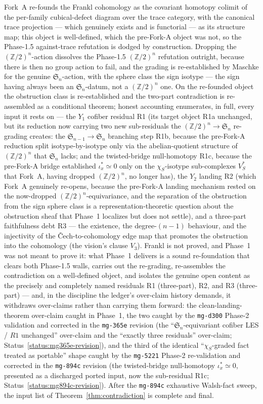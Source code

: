 \documentclass[11pt,oneside]{amsart}
\theoremstyle{plain}
\theoremstyle{definition}
\theoremstyle{remark}
\theoremstyle{honeststyle}
\newcommand{\Sym}{\mathfrak{S}}
\newcommand{\Z}{\mathbb{Z}}
\newcommand{\walsh}[1]{\chi_{#1}}
\begin{document}
Fork~A re-founds the Frankl cohomology as the covariant homotopy
colimit of the per-family cubical-defect diagram over the trace
category, with the canonical trace projection --- which genuinely
exists and is functorial --- as its structure map; this object is
well-defined, which the pre-Fork-A object was not, so the Phase-1.5
against-trace refutation is dodged by construction. Dropping the
$(\Z/2)^n$-action dissolves the Phase-1.5 $(\Z/2)^n$ refutation
outright, because there is then no group action to fail, and the
grading is re-established by Maschke for the genuine $\Sym_n$-action,
with the sphere class the sign isotype --- the sign having always been
an $\Sym_n$-datum, not a $(\Z/2)^n$ one. On the re-founded object the
obstruction class is re-established and the two-part contradiction is
re-assembled as a conditional theorem; honest accounting enumerates,
in full, every input it rests on --- the $Y_1$ cofiber residual R1
(its target object R1a unchanged, but its reduction now carrying two
new sub-residuals the $(\Z/2)^n\to\Sym_n$ re-grading creates: the
$\Sym_{n-1}\to\Sym_n$ branching step R1b, because the pre-Fork-A
reduction split isotype-by-isotype only via the abelian-quotient
structure of $(\Z/2)^n$ that $\Sym_n$ lacks; and the twisted-bridge
null-homotopy R1c, because the pre-Fork-A bridge established
$\iota_x^{*}\simeq0$ only on the $\walsh{S}$-isotype sub-complexes
$V_S^{*}$ that Fork~A, having dropped $(\Z/2)^n$, no longer has), the
$Y_2$ landing R2
(which Fork~A genuinely re-opens, because the pre-Fork-A landing
mechanism rested on the now-dropped $(\Z/2)^n$-equivariance, and the
separation of the obstruction from the sign sphere class is a
representation-theoretic question about the obstruction sheaf that
Phase~1 localizes but does not settle), and a three-part faithfulness
debt R3 --- the existence, the degree-$(n-1)$ behaviour, and the
injectivity of the \v{C}ech-to-cohomology edge map that promotes the
obstruction into the cohomology (the vision's clause $V_3$). Frankl is not proved, and Phase~1
was not meant to prove it: what Phase~1 delivers is a sound
re-foundation that clears both Phase-1.5 walls, carries out the
re-grading, re-assembles the contradiction on a well-defined object,
and isolates the genuine open content as the precisely and completely
named residuals R1 (three-part), R2, and R3 (three-part) --- and, in
the discipline the ledger's over-claim history demands, it withdraws
over-claims rather than carrying them forward: the
clean-landing-theorem over-claim caught in Phase~1, the two caught by
the \texttt{mg-d300} Phase-2 validation and corrected in the
\texttt{mg-365e} revision (the ``$\Sym_n$-equivariant cofiber LES /
$R1$ unchanged'' over-claim and the ``exactly three residuals''
over-claim; Status~\ref{status:mg365e-revision}), and the third of
the identical ``$\walsh{S}$-graded fact treated as portable'' shape
caught by the \texttt{mg-5221} Phase-2 re-validation and corrected in
the \texttt{mg-894c} revision (the twisted-bridge null-homotopy
$\iota_x^{*}\simeq0$, presented as a discharged ported input, now
the sub-residual R1c; Status~\ref{status:mg894c-revision}). After the
\texttt{mg-894c} exhaustive Walsh-fact sweep, the input list of
Theorem~\ref{thm:contradiction} is complete and final.
\end{document}
